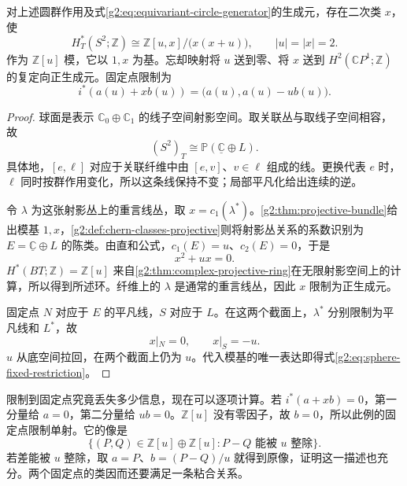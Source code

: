 \begin{theorem}\label{g2:thm:equivariant-sphere-ring}
	对上述圆群作用及式\eqref{g2:eq:equivariant-circle-generator}的生成元，存在二次类 \(x\)，使
	\begin{equation}\label{g2:eq:equivariant-sphere-ring}
		H_T^*(S^2;\mathbb Z)\cong\mathbb Z[u,x]/\bigl(x(x+u)\bigr),
		\qquad |u|=|x|=2.
	\end{equation}
	作为 \(\mathbb Z[u]\) 模，它以 \(1,x\) 为基。忘却映射将 \(u\) 送到零、将 \(x\) 送到 \(H^2(\mathbb CP^1;\mathbb Z)\) 的复定向正生成元。固定点限制为
	\begin{equation}\label{g2:eq:sphere-fixed-restriction}
		i^*(a(u)+x b(u))=\bigl(a(u),a(u)-u b(u)\bigr).
	\end{equation}
\end{theorem}
\begin{proof}
	球面是表示 \(\mathbb C_0\oplus\mathbb C_1\) 的线子空间射影空间。取关联丛与取线子空间相容，故
	\[
		(S^2)_T\cong\mathbb P(\underline{\mathbb C}\oplus L).
	\]
	具体地，\([e,\ell]\) 对应于关联纤维中由 \([e,v]\)、\(v\in\ell\) 组成的线。更换代表 \(e\) 时，\(\ell\) 同时按群作用变化，所以这条线保持不变；局部平凡化给出连续的逆。

	令 \(\lambda\) 为这张射影丛上的重言线丛，取 \(x=c_1(\lambda^*)\)。\cref{g2:thm:projective-bundle}给出模基 \(1,x\)，\cref{g2:def:chern-classes-projective}则将射影丛关系的系数识别为 \(E=\underline{\mathbb C}\oplus L\) 的陈类。由直和公式，\(c_1(E)=u\)、\(c_2(E)=0\)，于是
	\[
		x^2+ux=0.
	\]
	\(H^*(BT;\mathbb Z)=\mathbb Z[u]\) 来自\cref{g2:thm:complex-projective-ring}在无限射影空间上的计算，所以得到所述环。纤维上的 \(\lambda\) 是通常的重言线丛，因此 \(x\) 限制为正生成元。

	固定点 \(N\) 对应于 \(E\) 的平凡线，\(S\) 对应于 \(L\)。在这两个截面上，\(\lambda^*\) 分别限制为平凡线和 \(L^*\)，故
	\[
		x|_N=0,\qquad x|_S=-u.
	\]
	\(u\) 从底空间拉回，在两个截面上仍为 \(u\)。代入模基的唯一表达即得式\eqref{g2:eq:sphere-fixed-restriction}。
\end{proof}

限制到固定点究竟丢失多少信息，现在可以逐项计算。若 \(i^*(a+xb)=0\)，第一分量给 \(a=0\)，第二分量给 \(ub=0\)。\(\mathbb Z[u]\) 没有零因子，故 \(b=0\)，所以此例的固定点限制单射。它的像是
\begin{equation}\label{g2:eq:sphere-congruence-image}
	\{(P,Q)\in\mathbb Z[u]\oplus\mathbb Z[u]:P-Q\text{ 能被 }u\text{ 整除}\}.
\end{equation}
若差能被 \(u\) 整除，取 \(a=P\)、\(b=(P-Q)/u\) 就得到原像，证明这一描述也充分。两个固定点的类因而还要满足一条粘合关系。

